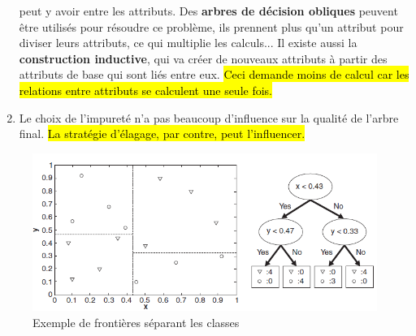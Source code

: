 \documentclass[letterpaper, 12pt]{article}
\begin{document}
\begin{enumerate}
					peut y avoir entre les attributs. Des \textbf{arbres
					de décision obliques} peuvent être utilisés pour 
					résoudre ce problème, ils prennent plus qu'un attribut
					pour diviser leurs attributs, ce qui multiplie les
					calculs... Il existe aussi la \textbf{construction 
					inductive}, qui va créer de nouveaux attributs à partir
					des attributs de base qui sont liés entre eux. \hl{Ceci 
					demande moins de calcul car les relations entre
					attributs se calculent une seule fois.}
				\item Le choix de l'impureté n'a pas beaucoup d'influence
					sur la qualité de l'arbre final. \hl{La stratégie
					d'élagage, par contre, peut l'influencer.}
			\end{enumerate}
			\begin{figure}[H]
				\centering
				\includegraphics[scale=0.75]{Images/tree_boundaries}
				\caption{Exemple de frontières séparant les classes}
				\label{fig:tree:boundaries}
			\end{figure}\noindent
\end{document}
